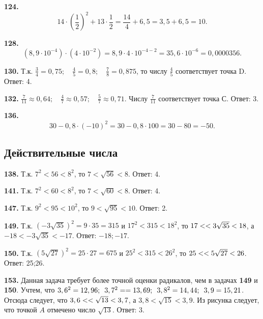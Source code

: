 \textbf{124.} $$14\cdot\left(\frac{1}{2}\right)^2+13\cdot\frac{1}{2}=\frac{14}{4}+6,5=3,5+6,5=10.$$

\textbf{128.}  $$\left(8,9\cdot10^{-4}\right)\cdot\left(4\cdot10^{-2}\right)=8,9\cdot4\cdot10^{-4-2}=35,6\cdot10^{-6}=0,0000356.$$

\textbf{130.} Т.к. $\frac{3}{4}=0,75;\quad\frac{4}{5}=0,8;\quad\frac{7}{8}=0,875$, то числу $\frac{4}{5}$ соответствует  точка D. \newline \null \hspace*{\fill} Ответ: 4. 

\textbf{132.}  $\frac{7}{11}\approx0,64;\quad\frac{4}{7}\approx0,57;\quad\frac{5}{7}\approx0,71$. Числу $\frac{7}{11}$ соответствует точка  С. \newline \null \hspace*{\fill} Ответ: 3. 

\textbf{136.} $$30-0,8\cdot\left(-10\right)^2=30-0,8\cdot100=30-80=-50.$$

\subsection{ Действительные числа}


\textbf{138.} Т.к. $7^2<56<8^2$, то $7<\sqrt{56}<8$.  Ответ: 4. 

\textbf{141.} Т.к. $7^2<60<8^2$, то $7<\sqrt{60}<8$. \newline \null \hspace*{\fill} Ответ: 4. 

\textbf{147.} Т.к. $9^2<95<10^2$, то $9<\sqrt{95}<10$. \newline \null \hspace*{\fill} Ответ: 2. 

\textbf{149.} Т.к. $\left(-3\sqrt{35}\right)^2=9\cdot35=315$ и $17^2<315<18^2$, то $17<\linebreak<3\sqrt{35}<18$, а $-18<-3\sqrt{35}<-17$. \newline \null \hspace*{\fill} Ответ: $-18;-17.$
 
\textbf{150.} Т.к. $\left(5\sqrt{27}\right)^2=25\cdot27=675$ и $25^2<315<26^2$, то $25<\linebreak<5\sqrt{27}<26$. \newline \null \hspace*{\fill} Ответ: 25;26.

\textbf{153.}  Данная задача требует более точной оценки радикалов, чем в задачах \textbf{149} и \textbf{150}.  Учтем, что $3,6^2=12,96;\enspace 3,7^2=\linebreak=13,69;\enspace 3,8^2=14,44;\enspace 3,9=15,21$. Отсюда следует, что $3,6<\linebreak<\sqrt{13}<3,7$, а $3,8<\sqrt{15}<3,9$. Из рисунка  следует, что точкой $A$ отмечено число $\sqrt{13}$. \newline \null \hspace*{\fill} Ответ: 3. 

